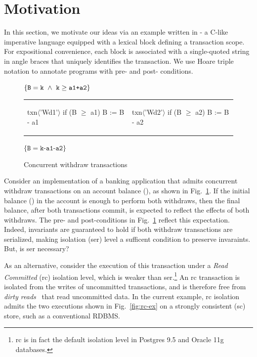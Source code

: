 \section{Motivation}
\label{sec:motivation}

In this section, we motivate our ideas via an example written in
\txnimp - a C-like imperative language equipped with a  lexical
block defining a transaction scope.  For expositional convenience,
each  block is associated with a single-quoted string in angle
braces that uniquely identifies the transaction. We use Hoare triple
notation to annotate programs with pre- and post- conditions.

\begin{figure}
\centering
$\{\texttt{B}=\texttt{k} ~\wedge~ \texttt{k}\ge\texttt{a1+a2}\}$
\begin{tabular}{l||l}
\begin{txnimpcode}
  txn$\langle$'Wd1'$\rangle${
    if (B $\ge$ a1) {
      B := B - a1
    }
  }
\end{txnimpcode}
&
\begin{txnimpcode}
  txn$\langle$'Wd2'$\rangle${
    if (B $\ge$ a2) {
      B := B - a2
    }
  }
\end{txnimpcode}
\\
\end{tabular}
$\{\texttt{B}=\texttt{k-a1-a2}\}$
\caption{\small Concurrent withdraw transactions}
\label{fig:motiv-eg-1}
\vspace*{-10pt}
\end{figure}

Consider an implementation of a banking application that admits
concurrent withdraw transactions on an account balance (), as
shown in Fig.~\ref{fig:motiv-eg-1}. If the initial balance () in
the account is enough to perform both withdraws, then the final
balance, after both transactions commit, is expected to reflect the
effects of both withdraws. The pre- and post-conditions in
Fig.~\ref{fig:motiv-eg-1} reflect this expectation. Indeed, invariants
are guaranteed to hold if both withdraw transactions are serialized,
making  isolation ({\sc ser}) level a sufficent
condition to preserve invaraints. But, is {\sc ser} necessary?

As an alternative, consider the execution of this transaction under a
\emph{Read Committed} ({\sc rc}) isolation level, which is weaker than
{\sc ser}.\footnote{{\sc rc} is in fact the default isolation level in
Postgres 9.5 and Oracle 11g databases.} An {\sc rc} transaction is
isolated from the writes of uncommitted transactions, and is therefore
free from \emph{dirty reads}~\cite{berenson} that read uncommitted
data. In the current example, {\sc rc} isolation admits the two
executions shown in Fig.~\ref{fig:rc-ex} on a strongly consistent
({\sc sc}) store, such as a conventional RDBMS.

